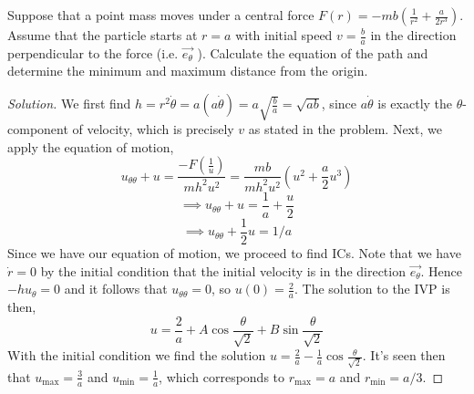 \begin{example}
  Suppose that a point mass moves under a central force
  $F(r)=-mb(\frac{1}{r^2}+\frac{a}{2r^3})$. Assume that the particle starts at
  $r=a$ with initial speed $v=\frac{b}{a}$ in the direction perpendicular to the
  force (i.e. $\vec{e_{\theta}}$ ). Calculate the equation of the path and
  determine the minimum and maximum distance from the origin.
\end{example}
\begin{proof}[Solution]
  We first find
  $h=r^2\dot{\theta}=a(a\dot{\theta})=a\sqrt{\frac{b}{a}}=\sqrt{ab}$, since
  $a\dot{\theta}$ is exactly the $\theta$-component of velocity, which is
  precisely $v$ as stated in the problem. Next, we apply the equation of motion,
  \[u_{\theta\theta} +u =\frac{-F(\frac{1}{u})}{mh^2u^2} =
  \frac{mb}{mh^2u^2}\left( u^2 + \frac{a}{2}u^3 \right)\]
  \[\implies u_{\theta\theta}+u = \frac{1}{a}+\frac{u}{2}\]
  \[\implies u_{\theta\theta}+\frac{1}{2}u = 1/a\]
  Since we have our equation of motion, we proceed to find ICs. Note that we
  have $\dot{r}=0$ by the initial condition that the initial velocity is in the
  direction $\vec{e_{\theta}}$. Hence $-hu_{\theta}=0$ and it follows that
  $u_{\theta\theta}=0$, so $u(0)=\frac{2}{a}$. The solution to the IVP is then,
  \[u=\frac{2}{a} + A\cos\frac{\theta}{\sqrt{2}} +
  B\sin\frac{\theta}{\sqrt{2}}\]
  With the initial condition we find the solution $u
  =\frac{2}{a}-\frac{1}{a}\cos\frac{\theta}{\sqrt{2}}$.
  It's seen then that $u_{\max}=\frac{3}{a}$ and $u_{\min}=\frac{1}{a}$, which
  corresponds to $r_{\max}=a$ and $r_{\min}=a/3$.
\end{proof}

